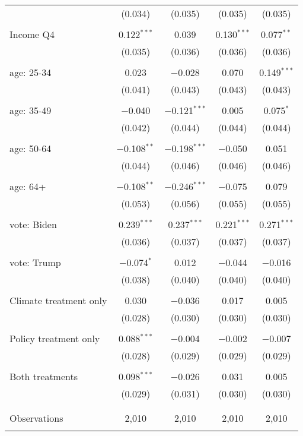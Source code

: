 \begin{tabular}{@{\extracolsep{5pt}}lcccc}
  & (0.034) & (0.035) & (0.035) & (0.035) \\ 
  & & & & \\ 
 Income Q4 & 0.122$^{***}$ & 0.039 & 0.130$^{***}$ & 0.077$^{**}$ \\ 
  & (0.035) & (0.036) & (0.036) & (0.036) \\ 
  & & & & \\ 
 age: 25-34 & 0.023 & $-$0.028 & 0.070 & 0.149$^{***}$ \\ 
  & (0.041) & (0.043) & (0.043) & (0.043) \\ 
  & & & & \\ 
 age: 35-49 & $-$0.040 & $-$0.121$^{***}$ & 0.005 & 0.075$^{*}$ \\ 
  & (0.042) & (0.044) & (0.044) & (0.044) \\ 
  & & & & \\ 
 age: 50-64 & $-$0.108$^{**}$ & $-$0.198$^{***}$ & $-$0.050 & 0.051 \\ 
  & (0.044) & (0.046) & (0.046) & (0.046) \\ 
  & & & & \\ 
 age: 64+ & $-$0.108$^{**}$ & $-$0.246$^{***}$ & $-$0.075 & 0.079 \\ 
  & (0.053) & (0.056) & (0.055) & (0.055) \\ 
  & & & & \\ 
 vote: Biden & 0.239$^{***}$ & 0.237$^{***}$ & 0.221$^{***}$ & 0.271$^{***}$ \\ 
  & (0.036) & (0.037) & (0.037) & (0.037) \\ 
  & & & & \\ 
 vote: Trump & $-$0.074$^{*}$ & 0.012 & $-$0.044 & $-$0.016 \\ 
  & (0.038) & (0.040) & (0.040) & (0.040) \\ 
  & & & & \\ 
 Climate treatment only & 0.030 & $-$0.036 & 0.017 & 0.005 \\ 
  & (0.028) & (0.030) & (0.030) & (0.030) \\ 
  & & & & \\ 
 Policy treatment only & 0.088$^{***}$ & $-$0.004 & $-$0.002 & $-$0.007 \\ 
  & (0.028) & (0.029) & (0.029) & (0.029) \\ 
  & & & & \\ 
 Both treatments & 0.098$^{***}$ & $-$0.026 & 0.031 & 0.005 \\ 
  & (0.029) & (0.031) & (0.030) & (0.030) \\ 
  & & & & \\ 
\hline \\[-1.8ex] 

Observations & 2,010 & 2,010 & 2,010 & 2,010 \\ 
\hline 
\hline \\[-1.8ex] 
\end{tabular} 